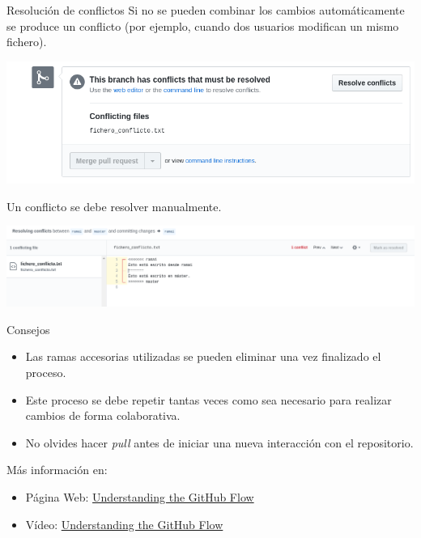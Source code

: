 \documentclass[xcolor={usenames,svgnames,dvipsnames}]{beamer}
\begin{document}
\begin{frame}[label={sec:orgf54e116}]{Resolución de conflictos}
Si no se pueden combinar los cambios automáticamente se produce un conflicto (por ejemplo, cuando dos usuarios modifican un mismo fichero).

\begin{center}
\includegraphics[width=.9\linewidth]{figs/conflict_web.png}
\end{center}

Un conflicto se debe resolver manualmente.
\begin{center}
\includegraphics[width=.9\linewidth]{figs/resolve_conflict_web.png}
\end{center}
\end{frame}

\begin{frame}[label={sec:org9b11ca0}]{Consejos}
\begin{itemize}
\item Las ramas accesorias utilizadas se pueden eliminar una vez finalizado el proceso.

\item Este proceso se debe repetir tantas veces como sea necesario para realizar cambios de forma colaborativa.

\item \alert{No olvides hacer \emph{pull} antes de iniciar una nueva interacción con el repositorio}.
\end{itemize}

\begin{block}{Más información en:}
\begin{itemize}
\item Página Web: \href{https://guides.github.com/introduction/flow/}{Understanding the GitHub Flow}
\item Vídeo: \href{https://youtu.be/PBI2Rz-ZOxU}{Understanding the GitHub Flow}
\end{itemize}
\end{block}
\end{frame}
\end{document}
